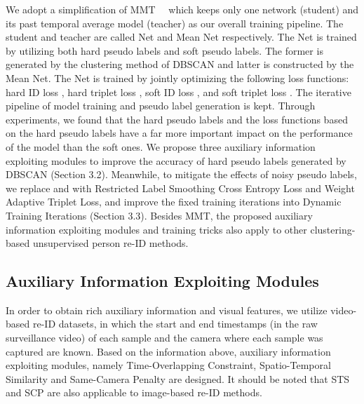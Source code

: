 \documentclass[10pt,twocolumn,letterpaper]{article}
\begin{document}
We adopt a simplification of MMT~\cite{mmt}~\cite{mmt2} which keeps only one network (student) and its past temporal average model (teacher) as our overall training pipeline. The student and teacher are called Net and Mean Net respectively. The Net is trained by utilizing both hard pseudo labels and soft pseudo labels. The former is generated by the clustering method of DBSCAN and latter is constructed by the Mean Net. The Net is trained by jointly optimizing the following loss functions: hard ID loss , hard triplet loss , soft ID loss , and soft triplet loss . The iterative pipeline of model training and pseudo label generation is kept. Through experiments, we found that the hard pseudo labels and the loss functions based on the hard pseudo labels have a far more important impact on the performance of the model than the soft ones. We propose three auxiliary information exploiting modules to improve the accuracy of hard pseudo labels generated by DBSCAN (Section 3.2). Meanwhile, to mitigate the effects of noisy pseudo labels, we replace  and  with Restricted Label Smoothing Cross Entropy Loss and Weight Adaptive Triplet Loss, and improve the fixed training iterations into Dynamic Training Iterations (Section 3.3). Besides MMT, the proposed auxiliary information exploiting modules and training tricks also apply to other clustering-based unsupervised person re-ID methods.

\subsection{Auxiliary Information Exploiting Modules}

In order to obtain rich auxiliary information and visual features, we utilize video-based re-ID datasets, in which the start and end timestamps (in the raw surveillance video) of each sample and the camera where each sample was captured are known. Based on the information above, auxiliary information exploiting modules, namely Time-Overlapping Constraint, Spatio-Temporal Similarity and Same-Camera Penalty are designed. It should be noted that STS and SCP are also applicable to image-based re-ID methods.
\end{document}
